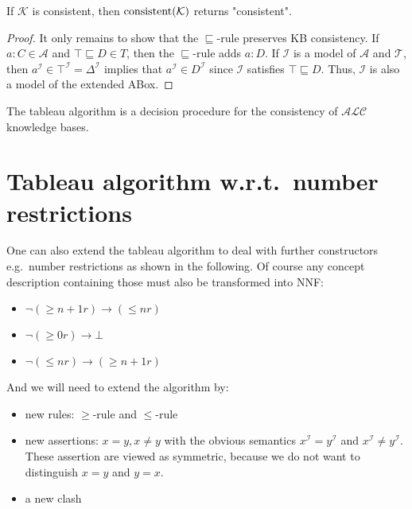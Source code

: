\newpage
{}
\begin{lemma}[Completeness]
	If $ \mathcal{K}$ is consistent, then $\operatorname{\text{consistent}}(\mathcal{K})$ returns "consistent".
\end{lemma}
\begin{proof}
	It only remains to show that the $\sqsubseteq$-rule preserves KB consistency.
	If $a :C \in \mathcal{A}$ and $\top \sqsubseteq D \in T$,
	then the $\sqsubseteq$-rule adds $a:D$.
	If $\mathcal{I}$ is a model of $\mathcal{A}$ and $\mathcal{T}$, then
	$a^\mathcal{I} \in \top^\mathcal{I}=\Delta^\mathcal{I}$ implies that $a^\mathcal{I} \in D^\mathcal{I}$ 
	since $\mathcal{I}$ satisfies $\top \sqsubseteq D$.
	Thus, $\mathcal{I}$ is also a model of the extended ABox.
\end{proof}

\begin{theorem}
	The tableau algorithm is a decision procedure for the consistency of $\mathcal{ALC}$ knowledge bases.
\end{theorem}

\newpage
\section{Tableau algorithm w.r.t.\ number restrictions}
One can also extend the tableau algorithm to deal with further constructors e.g.\ number restrictions as shown in the following.
Of course any concept description containing those must also be transformed into NNF:
\begin{itemize}
	\item $\neg \left( \geq n+1 r \right) \to ( \leq n r)$ 
	\item $\neg \left( \geq 0 r \right) \to \bot$
	\item $\neg \left( \leq n r \right) \to \left( \geq n + 1 r \right)$
\end{itemize}
And we will need to extend the algorithm by:
\begin{itemize}
	\item new rules: $ \geq$-rule and $ \leq$-rule
	\item new assertions: $x=y, x \neq y$ with the obvious semantics $x^\mathcal{I} = y^\mathcal{I}$ and $x^\mathcal{I} \neq y^\mathcal{I}$.
		These assertion are viewed as symmetric, because we do not want to distinguish $x = y$ and $y = x$.
	 \item a new clash
\end{itemize}


